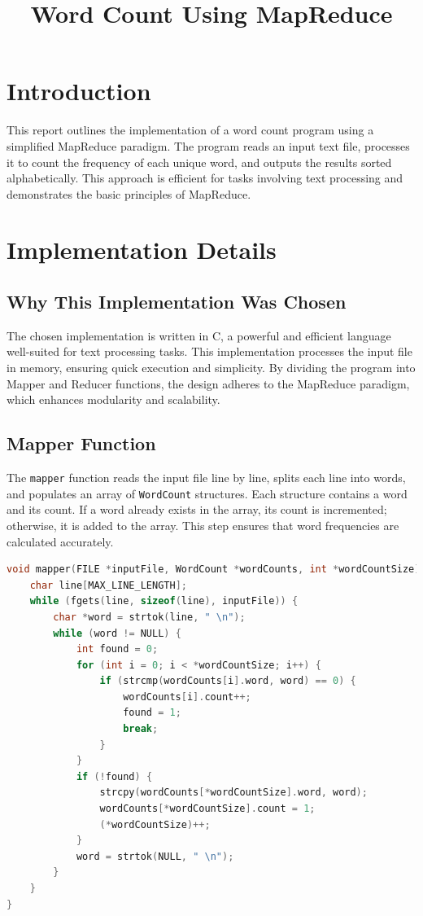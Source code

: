 \documentclass[12pt]{article}
\title{Word Count Using MapReduce}
\author{}
\date{}
\begin{document}
\maketitle

\section*{Introduction}
This report outlines the implementation of a word count program using a simplified MapReduce paradigm. The program reads an input text file, processes it to count the frequency of each unique word, and outputs the results sorted alphabetically. This approach is efficient for tasks involving text processing and demonstrates the basic principles of MapReduce.

\section*{Implementation Details}

\subsection*{Why This Implementation Was Chosen}
The chosen implementation is written in C, a powerful and efficient language well-suited for text processing tasks. This implementation processes the input file in memory, ensuring quick execution and simplicity. By dividing the program into Mapper and Reducer functions, the design adheres to the MapReduce paradigm, which enhances modularity and scalability.

\subsection*{Mapper Function}
The \texttt{mapper} function reads the input file line by line, splits each line into words, and populates an array of \texttt{WordCount} structures. Each structure contains a word and its count. If a word already exists in the array, its count is incremented; otherwise, it is added to the array. This step ensures that word frequencies are calculated accurately.

\begin{lstlisting}[language=C, caption=Mapper Function]
void mapper(FILE *inputFile, WordCount *wordCounts, int *wordCountSize) {
    char line[MAX_LINE_LENGTH];
    while (fgets(line, sizeof(line), inputFile)) {
        char *word = strtok(line, " \n");
        while (word != NULL) {
            int found = 0;
            for (int i = 0; i < *wordCountSize; i++) {
                if (strcmp(wordCounts[i].word, word) == 0) {
                    wordCounts[i].count++;
                    found = 1;
                    break;
                }
            }
            if (!found) {
                strcpy(wordCounts[*wordCountSize].word, word);
                wordCounts[*wordCountSize].count = 1;
                (*wordCountSize)++;
            }
            word = strtok(NULL, " \n");
        }
    }
}
\end{lstlisting}
\end{document}
